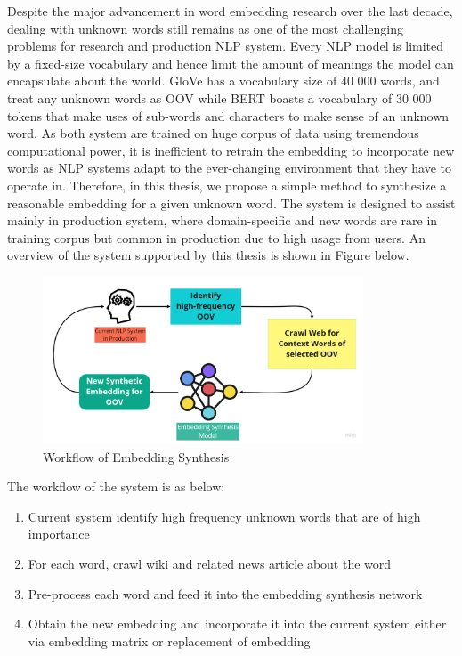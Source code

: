 Despite the major advancement in word embedding research over the last decade, dealing with unknown words still remains as one of the most challenging problems for research and production NLP system. Every NLP model is limited by a fixed-size vocabulary and hence limit the amount of meanings the model can encapsulate about the world. GloVe has a vocabulary size of 40 000 words, and treat any unknown words as OOV while BERT boasts a vocabulary of 30 000 tokens that make uses of sub-words and characters to make sense of an unknown word. As both system are trained on huge corpus of data using tremendous computational power, it is inefficient to retrain the embedding to incorporate new words as NLP systems adapt to the ever-changing environment that they have to operate in. Therefore, in this thesis, we propose a simple method to synthesize a reasonable embedding for a given unknown word. The system is designed to assist mainly in production system, where domain-specific and new words are rare in training corpus but common in production due to high usage from users. An overview of the system supported by this thesis is shown in Figure  below. 

\begin{figure}[htbp]
  \centering
    \includegraphics[width=0.85\textwidth]{Figures/Chapter1/workflow.jpg}
  \caption{Workflow of Embedding Synthesis}
  \label{fig:workflow}
\end{figure}

The workflow of the system is as below:

\begin{enumerate}
    \item Current system identify high frequency unknown words that are of high importance
    \item For each word, crawl wiki and related news article about the word 
    \item Pre-process each word and feed it into the embedding synthesis network 
    \item Obtain the new embedding and incorporate it into the current system either via embedding matrix or replacement of embedding
\end{enumerate}

